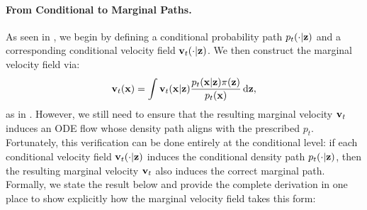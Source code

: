 
\paragraph{From Conditional to Marginal Paths.} As seen in , we begin by defining a conditional probability path $p_t(\cdot| {\mathbf{z}})$ and a corresponding conditional velocity field ${\mathbf{v}}_t(\cdot| {\mathbf{z}})$. We then construct the marginal velocity field via:
\[
    {\mathbf{v}}_t({\mathbf{x}}) 
    = \int {\mathbf{v}}_t({\mathbf{x}}| {\mathbf{z}}) \frac{p_t({\mathbf{x}}| {\mathbf{z}}) \pi({\mathbf{z}})}{p_t({\mathbf{x}})}   \mathop{}\!\mathrm{d} {\mathbf{z}},
\]
as in . However, we still need to ensure that the resulting marginal velocity ${\mathbf{v}}_t$ induces an ODE flow whose density path aligns with the prescribed $p_t$. Fortunately, this verification can be done entirely at the conditional level: if each conditional velocity field ${\mathbf{v}}_t(\cdot| {\mathbf{z}})$ induces the conditional density path $p_t(\cdot| {\mathbf{z}})$, then the resulting marginal velocity ${\mathbf{v}}_t$ also induces the correct marginal path. Formally, we state the result below and provide the complete derivation in one place to show explicitly how the marginal velocity field takes this form:

